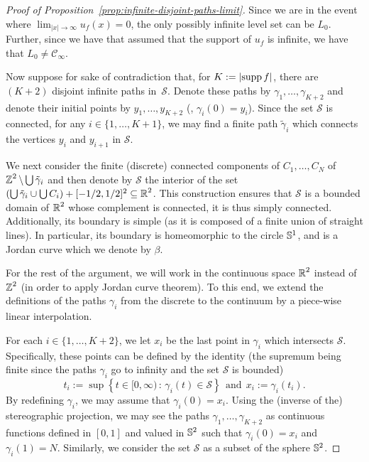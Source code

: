 \documentclass[12pt]{amsart}
\numberwithin{equation}{section}
\begin{document}
	\begin{proof}[Proof of Proposition~\ref{prop:infinite-disjoint-paths-limit}]
		
		
		
		
		Since we are in the event where  $\lim_{|x| \to \infty} u_f(x) = 0$, the only
		possibly infinite level set can be $L_0$. Further, since we have that assumed that the support of $u_f$ is infinite,  we have that $L_0 \neq \mathscr{C}_{\infty}$.
		
		Now suppose for sake of contradiction that, for $K := \left| \supp f \right|$, there are $(K+2)$ disjoint infinite paths in~$\mathcal{S}$. Denote these paths by $\gamma_1 , \ldots, \gamma_{K+2}$ and denote their initial points by $y_1 , \ldots, y_{K+2}$ (\ie, $\gamma_i(0) = y_i$). Since the set $\mathcal{S}$ is connected, for any $i \in \{1 , \ldots, K+1 \}$, we may find a finite path $\tilde \gamma_i$ which connects the vertices $y_i$ and $y_{i+1}$ in $\mathcal{S}$. 
		
		We next consider the finite (discrete) connected components of $C_1 , \ldots, C_N$ of $\Z^2 \setminus \bigcup \tilde \gamma_i$ and then denote by $\mathscr{S}$ the interior of the set $(\bigcup \tilde \gamma_i \cup \bigcup C_i) + [- 1/2 , 1/2]^2 \subseteq \R^2$. This construction ensures that $\mathscr{S}$ is a bounded domain of $\R^2$ whose complement is connected, it is thus simply connected. Additionally, its boundary is simple (as it is composed of a finite union of straight lines). In particular, its boundary is homeomorphic to the circle $\S^1$, and is a Jordan curve which we denote by $\beta$.
		
		
		For the rest of the argument, we will work in the continuous space $\R^2$ instead of $\Z^2$ (in order to apply Jordan curve theorem). To this end, we extend the definitions of the paths $\gamma_i$ from the discrete to the continuum by a piece-wise linear interpolation.
		
		
		For each $i \in \{ 1 , \ldots, K+2\}$, we let $x_i$ be the last point in $\gamma_i$ which intersects $\mathscr{S}$. Specifically, these points can be defined by the identity (the supremum being finite since the paths $\gamma_i$ go to infinity and the set $\mathscr{S}$ is bounded)
		\begin{equation*}
			t_i := \sup \left\{ t \in [0 , \infty) \, : \, \gamma_i(t) \in \mathscr{S} \right\} ~~\mbox{and}~~ x_i := \gamma_i(t_i).   
		\end{equation*}
		By redefining $\gamma_i$, we may assume that $\gamma_i(0) = x_i$. Using the (inverse of the) stereographic projection, we may see the paths $\gamma_1, \ldots, \gamma_{K+2}$ as continuous functions defined in $[0 , 1]$ and valued in $\S^2$ such that $\gamma_i(0) = x_i$ and $\gamma_i(1) = N$. Similarly, we consider the set $\mathscr{S}$ as a subset of the sphere $\S^2$.
		

\end{proof}
\end{document}
